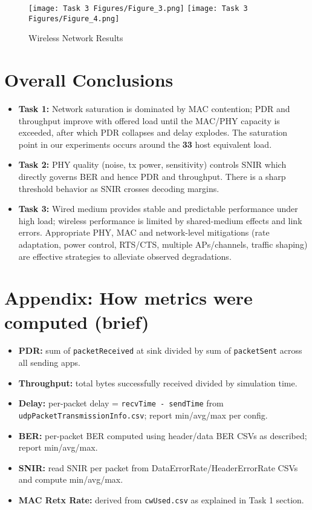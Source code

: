 \documentclass{rapport}
\begin{document}
\begin{figure}[H]
  \centering
  \texttt{[image: Task 3 Figures/Figure\_3.png]}
  \texttt{[image: Task 3 Figures/Figure\_4.png]}
  \caption{Wireless Network Results}
  \label{fig:wireless_perf}
\end{figure}

\newpage

\section{Overall Conclusions}
\begin{itemize}
  \item \textbf{Task 1:} Network saturation is dominated by MAC contention; PDR and throughput improve with offered load until the MAC/PHY capacity is exceeded, after which PDR collapses and delay explodes. The saturation point in our experiments occurs around the \textbf{33} host equivalent load.
  \item \textbf{Task 2:} PHY quality (noise, tx power, sensitivity) controls SNIR which directly governs BER and hence PDR and throughput. There is a sharp threshold behavior as SNIR crosses decoding margins.
  \item \textbf{Task 3:} Wired medium provides stable and predictable performance under high load; wireless performance is limited by shared-medium effects and link errors. Appropriate PHY, MAC and network-level mitigations (rate adaptation, power control, RTS/CTS, multiple APs/channels, traffic shaping) are effective strategies to alleviate observed degradations.
\end{itemize}

\section*{Appendix: How metrics were computed (brief)}
\begin{itemize}
  \item \textbf{PDR:} sum of \texttt{packetReceived} at sink divided by sum of \texttt{packetSent} across all sending apps.
  \item \textbf{Throughput:} total bytes successfully received divided by simulation time.
  \item \textbf{Delay:} per-packet delay = \texttt{recvTime - sendTime} from \texttt{udpPacketTransmissionInfo.csv}; report min/avg/max per config.
  \item \textbf{BER:} per-packet BER computed using header/data BER CSVs as described; report min/avg/max.
  \item \textbf{SNIR:} read SNIR per packet from DataErrorRate/HeaderErrorRate CSVs and compute min/avg/max.
  \item \textbf{MAC Retx Rate:} derived from \texttt{cwUsed.csv} as explained in Task 1 section.
\end{itemize}
\end{document}
